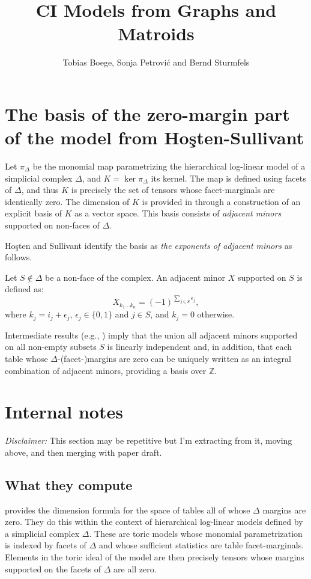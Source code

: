 \documentclass[12pt]{extarticle}
\title{\bf  CI Models from Graphs and Matroids}
\author{Tobias Boege, Sonja Petrovi\'c and Bernd Sturmfels}
\date{}
\theoremstyle{definition}
\numberwithin{theorem}{section}
\begin{document}
\maketitle




\section*{The basis of the zero-margin part of the model from Ho\c{s}ten-Sullivant} 

Let $\pi_\Delta$ be the monomial map parametrizing the hierarchical log-linear model of a simplicial complex $\Delta$, and $K=\ker \pi_\Delta$ its kernel. The map is defined using facets of $\Delta$, and thus $K$ is precisely the set of tensors whose facet-marginals are identically zero. 
The dimension of $K$ is provided in \cite[Theorem 2.6]{HoSu02} through a construction of an explicit basis of $K$ as a vector space.  This basis consists of  \emph{adjacent minors} supported on non-faces of $\Delta$. 
 
Ho\c{s}ten and Sullivant identify  the basis as \emph{the exponents of adjacent minors}  as follows. 

Let $S\not\in\Delta$ be a non-face of the complex. An adjacent minor $X$ supported on $S$ is defined as: 
\[
	X_{k_1\dots k_n} =(-1)^{\sum_{j\in S}\epsilon_j}, 
\]
where $k_j=i_j+\epsilon_j$, $\epsilon_j\in\{0,1\}$ and $j\in S$, and $k_j=0$ otherwise.

Intermediate results (e.g.,  \cite[Lemma 2.1]{HoSu02}) imply that the union all adjacent minors supported on all non-empty subsets $S$ is  linearly independent and, in addition, that each table whose $\Delta$-(facet-)margins are zero can be uniquely written as an integral combination of adjacent minors, providing a basis over $\mathbb Z$. 


\section*{Internal notes} 
\emph{Disclaimer:} This section may be repetitive but I'm extracting from it, moving above, and then merging with paper draft. 

\subsection*{What they compute} 
\cite[Theorem 2.6]{HoSu02} provides the dimension formula for the space of tables all of whose $\Delta$ margins are zero. %
They do this within the context of hierarchical log-linear models defined by a simplicial complex $\Delta$. These are toric models whose monomial parametrization is indexed by facets of $\Delta$ and whose sufficient statistics are table facet-marginals. Elements in the toric ideal of the model are then precisely tensors whose  margins supported on the facets of $\Delta$ are all zero. 
\end{document}

